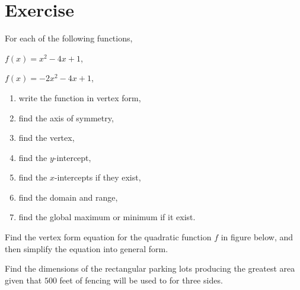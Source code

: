 \newpage

\section*{Exercise}

\begin{exercise}
  For each of the following functions,
  \begin{enumerate*}[label={(\alph*)}]
    \item $f(x)=x^2-4x+1$,
    \item $f(x)=-2x^2-4x+1$,\hfill\null
  \end{enumerate*}
  \begin{enumerate}
    \item write the function in vertex form,
    \item find the axis of symmetry,
    \item find the vertex,
    \item find the $y$-intercept,
    \item find the $x$-intercepts if they exist,
    \item find the domain and range,
    \item find the global maximum or minimum if it exist.
  \end{enumerate}
\end{exercise}

\begin{exercise}
  Find the vertex form equation for the quadratic function $f$ in figure below, and then simplify the equation into general form.
 
 \end{exercise}

\newpage

\begin{exercise}
  Find the dimensions of the rectangular parking lots producing the greatest area given that \(500\) feet of fencing will be used to for three sides.
\end{exercise}

